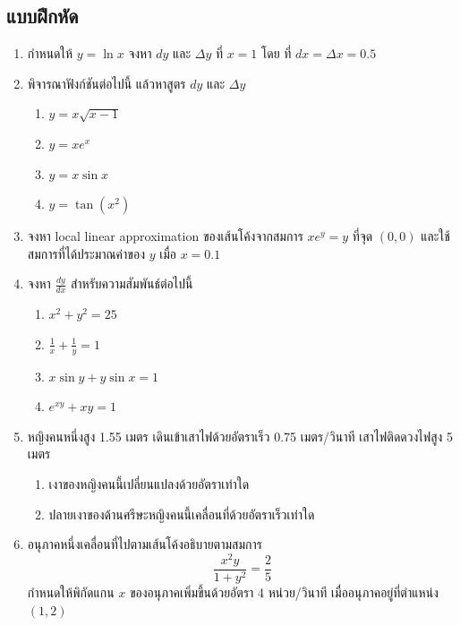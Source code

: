\documentclass[
]{book}
\theoremstyle{definition}
\theoremstyle{definition}
\theoremstyle{definition}
\theoremstyle{definition}
\theoremstyle{remark}
\begin{document}
\subsection{แบบฝึกหัด}\label{uxe41uxe1auxe1auxe1duxe01uxe2buxe14-2}

\begin{enumerate}
\def\labelenumi{\arabic{enumi}.}
\item
  กำหนดให้ \(y= \ln x\) จงหา \(dy\) และ \(\Delta y\) ที่ \(x=1\) โดย ที่
  \(dx = \Delta x = 0.5\)
\item
  พิจารณาฟังก์ชันต่อไปนี้ แล้วหาสูตร \(dy\) และ \(\Delta y\)

  \begin{enumerate}
  \def\labelenumii{\arabic{enumii}.}
  \item
    \(\displaystyle y = x\sqrt{x-1}\)
  \item
    \(\displaystyle y = xe^x\)
  \item
    \(\displaystyle y = x\sin  x\)
  \item
    \(\displaystyle y = \tan (x^2)\)
  \end{enumerate}
\item
  จงหา local linear approximation ของเส้นโค้งจากสมการ \(xe^y = y\) ที่จุด
  \((0,0)\) และใช้สมการที่ได้ประมาณค่าของ \(y\) เมื่อ \(x=0.1\)
\item
  จงหา \(\frac{dy}{dx}\) สำหรับความสัมพันธ์ต่อไปนี้

  \begin{enumerate}
  \def\labelenumii{\arabic{enumii}.}
  \item
    \(x^2+ y^2 = 25\)
  \item
    \(\frac{1}{x} + \frac{1}{y} = 1\)
  \item
    \(x\sin y + y\sin x = 1\)
  \item
    \(e^{xy} + xy = 1\)
  \end{enumerate}
\item
  หญิงคนหนึ่งสูง 1.55 เมตร เดินเข้าเสาไฟด้วยอัตราเร็ว 0.75 เมตร/วินาที
  เสาไฟติดดวงไฟสูง 5 เมตร

  \begin{enumerate}
  \def\labelenumii{\arabic{enumii}.}
  \item
    เงาของหญิงคนนี้เปลี่ยนแปลงด้วยอัตราเท่าใด
  \item
    ปลายเงาของด้านศรีษะหญิงคนนี้เคลื่อนที่ด้วยอัตราเร็วเท่าใด
  \end{enumerate}
\item
  อนุภาคหนึ่งเคลื่อนที่ไปตามเส้นโค้งอธิบายตามสมการ
  \[\frac{x^2y}{1+y^2} = \frac{2}{5}\] กำหนดให้พิกัดแกน \(x\)
  ของอนุภาคเพิ่มขึ้นด้วยอัตรา 4 หน่วย/วินาที เมื่ออนุภาคอยู่ที่ตำแหน่ง \((1,2)\)


\end{enumerate}
\end{document}
